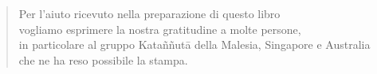 \cleartorecto
\thispagestyle{empty}

\mbox{}
\vfill

\begin{quote}
\centering

Per l’aiuto ricevuto nella preparazione di questo libro\\
vogliamo esprimere la nostra gratitudine a molte persone,\\
in particolare al gruppo Kataññutā della Malesia, Singapore e Australia\\
che ne ha reso possibile la stampa.

\end{quote}

\vspace*{4\baselineskip}

\vfill
\mbox{}

